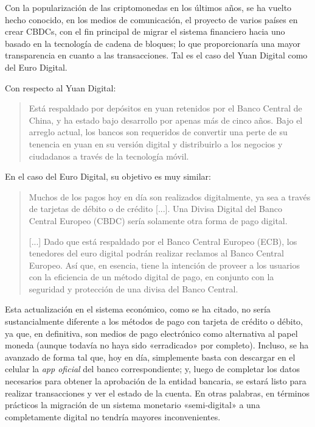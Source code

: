 \documentclass[12pt,a4paper,twoside]{book}
\begin{document}
Con la popularización de las criptomonedas en los últimos años, se ha vuelto hecho conocido, en los medios de comunicación, el proyecto de varios países en crear CBDCs, con el fin principal de migrar el sistema financiero hacia uno basado en la tecnología de cadena de bloques; lo que proporcionaría una mayor transparencia en cuanto a las transacciones. Tal es el caso del Yuan Digital como del Euro Digital.

Con respecto al Yuan Digital:

\begin{quotation}
Está respaldado por depósitos en yuan retenidos por el Banco Central de China, y ha estado bajo desarrollo por apenas más de cinco años. Bajo el arreglo actual, los bancos son requeridos de convertir una perte de su tenencia en yuan en su versión digital y distribuirlo a los negocios y ciudadanos a través de la tecnología móvil. \cite{digital:yuan}
\end{quotation}

En el caso del Euro Digital, su objetivo es muy similar:

\begin{quotation}
Muchos de los pagos hoy en día son realizados digitalmente, ya sea a través de tarjetas de débito o de crédito [...]. Una Divisa Digital del Banco Central Europeo (CBDC) sería solamente otra forma de pago digital.

[...] Dado que está respaldado por el Banco Central Europeo (ECB), los tenedores del euro digital podrán realizar reclamos al Banco Central Europeo. Así que, en esencia, tiene la intención de proveer a los usuarios con la eficiencia de un método digital de pago, en conjunto con la seguridad y protección de una divisa del Banco Central. \cite{digital:euro}
\end{quotation}

Esta actualización en el sistema económico, como se ha citado, no sería sustancialmente diferente a los métodos de pago con tarjeta de crédito o débito, ya que, en definitiva, son medios de pago electrónico como alternativa al papel moneda (aunque todavía no haya sido «erradicado» por completo). Incluso, se ha avanzado de forma tal que, hoy en día, simplemente basta con descargar en el celular la \textit{app oficial} del banco correspondiente; y, luego de completar los datos necesarios para obtener la aprobación de la entidad bancaria, se estará listo para realizar transacciones y ver el estado de la cuenta. En otras palabras, en términos prácticos la migración de un sistema monetario «semi-digital» a una completamente digital no tendría mayores inconvenientes. 
\end{document}
